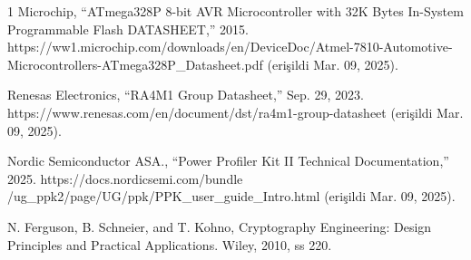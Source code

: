 \documentclass[conference, a4paper]{IEEEtran}
\begin{document}
\begin{thebibliography}{1}
Microchip, “ATmega328P 8-bit AVR Microcontroller with 32K Bytes In-System Programmable Flash DATASHEET,” 2015. https://ww1.microchip.com/downloads/en/DeviceDoc/Atmel-7810-Automotive-Microcontrollers-ATmega328P\_Datasheet.pdf (erişildi Mar. 09, 2025).

Renesas Electronics, “RA4M1 Group Datasheet,” Sep. 29, 2023. https://www.renesas.com/en/document/dst/ra4m1-group-datasheet (erişildi Mar. 09, 2025).

Nordic Semiconductor ASA., “Power Profiler Kit II Technical Documentation,” 2025. https://docs.nordicsemi.com/bundle /ug\_ppk2/page/UG/ppk/PPK\_user\_guide\_Intro.html (erişildi Mar. 09, 2025).

N. Ferguson, B. Schneier, and T. Kohno, Cryptography Engineering: Design Principles and Practical Applications. Wiley, 2010, ss 220.

\end{thebibliography}


\end{document}
